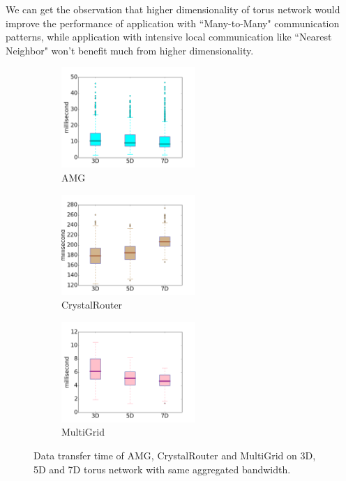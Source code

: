 \documentclass[conference]{IEEEtran}
\begin{document}
We can get the observation that higher dimensionality of torus network would improve the performance of application with ``Many-to-Many" communication patterns, while application with intensive local communication like ``Nearest Neighbor" won't benefit much from higher dimensionality. 

\begin{figure}[t!]
    \centering
    \begin{subfigure}[t]{0.32\textwidth}
        \centering
        \includegraphics[height=1.5in]{figs/samebdw/amg}
        \caption{AMG}
        \label{fig:samebd-amg}
    \end{subfigure}%
    \hspace{1em}%
    \begin{subfigure}[t]{0.32\textwidth}
        \centering
        \includegraphics[height=1.5in]{figs/samebdw/cr}
        \caption{CrystalRouter}
        \label{fig:samebd-cr}
    \end{subfigure}%
    \begin{subfigure}[t]{0.32\textwidth}
        \centering
        \includegraphics[height=1.5in]{figs/samebdw/mg}
        \caption{MultiGrid}
        \label{fig:samebd-mg}
    \end{subfigure}%
   \caption{Data transfer time of AMG, CrystalRouter and MultiGrid on 3D, 5D and 7D torus network with same aggregated bandwidth. }
   \label{fig: bandwidth-time-box}
\end{figure}
\end{document}
